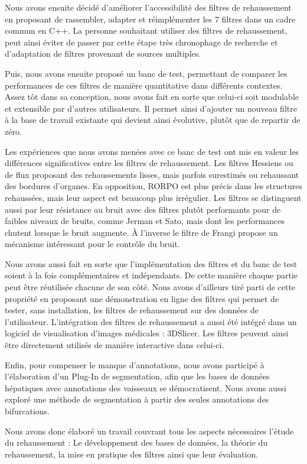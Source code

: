 Nous avons ensuite décidé d'améliorer l'accessibilité des filtres de rehaussement en proposant de rassembler, adapter et réimplémenter les 7 filtres dans un cadre commun en C++. La personne souhaitant utiliser des filtres de rehaussement, peut ainsi éviter de passer par cette étape très chronophage de recherche et d'adaptation de filtres provenant de sources multiples. 

Puis, nous avons ensuite proposé un banc de test, permettant de comparer les performances de ces filtres de manière quantitative dans différents contextes. Assez tôt dans sa conception, nous avons fait en sorte que celui-ci soit modulable et extensible par d'autres utilisateurs. Il permet ainsi d'ajouter un nouveau filtre à la base de travail existante qui devient ainsi évolutive, plutôt que de repartir de zéro.

Les expériences que nous avons menées avec ce banc de test ont mis en valeur les différences significatives entre les filtres de rehaussement. Les filtres Hessiens ou de flux proposant des rehaussements lisses, mais parfois surestimés ou rehaussant des bordures d'organes. En opposition, RORPO est plus précis dans les structures rehaussées, mais leur aspect est beaucoup plus irrégulier. Les filtres se distinguent aussi par leur résistance au bruit avec des filtres plutôt performants pour de faibles niveaux de bruits, comme Jerman et Sato, mais dont les performances chutent lorsque le bruit augmente. À l'inverse le filtre de Frangi propose un mécanisme intéressant pour le contrôle du bruit.

Nous avons aussi fait en sorte que l'implémentation des filtres et du banc de test soient à la fois complémentaires et indépendants. De cette manière chaque partie peut être réutilisée chacune de son côté. Nous avons d'ailleurs tiré parti de cette propriété en proposant une démonstration en ligne des filtres qui permet de tester, sans installation, les filtres de rehaussement sur des données de l'utilisateur. L'intégration des filtres de rehaussement a aussi été intégré dans un logiciel de visualisation d'images médicales : 3DSlicer. Les filtres peuvent ainsi être directement utilisés de manière interactive dans celui-ci.

Enfin, pour compenser le manque d'annotations, nous avons participé à l'élaboration d'un Plug-In de segmentation, afin que les bases de données hépatiques avec annotations des vaisseaux se démocratisent. Nous avons aussi exploré une méthode de segmentation à partir des seules annotations des bifurcations.

Nous avons donc élaboré un travail couvrant tous les aspects nécessaires l'étude du rehaussement : Le développement des bases de données, la théorie du rehaussement, la mise en pratique des filtres ainsi que leur évaluation.